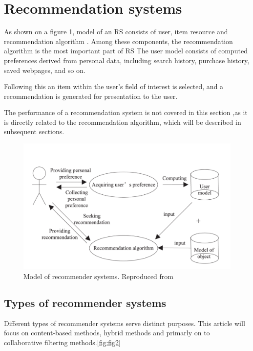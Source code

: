 \documentclass[10pt,twoside,english,a4paper]{article}
\begin{document}
\section{Recommendation systems}
As shown on a figure \ref{fig:fig1}, model of an RS consists of user, item resource and recommendation algorithm \cite{8506344}.
Among these components, the recommendation algorithm is the most important part of RS\cite{ren2012research}\cite{zhang2015research}
The user model consists of computed preferences derived from personal data, including search history, purchase history, saved webpages, and so on.

Following this an item within the user’s field of interest is selected, and a recommendation is generated for presentation to the user.

The performance of a recommendation system is not covered in this section ,as it is directly related to the recommendation algorithm, which will be described in subsequent sections.

\begin{figure}[H]
	\includegraphics[width=1\textwidth]{./diagrams/recommender_system_model.png}
	\caption{Model of recommender systems. Reproduced from \cite{8506344}}
	\label{fig:fig1}
\end{figure}


\subsection{Types of recommender systems}

Different types of recommender systems serve distinct purposes. This article will focus on content-based methods, hybrid methods and primarly on to collaborative filtering methods.\ref{fig:fig2}
\end{document}
